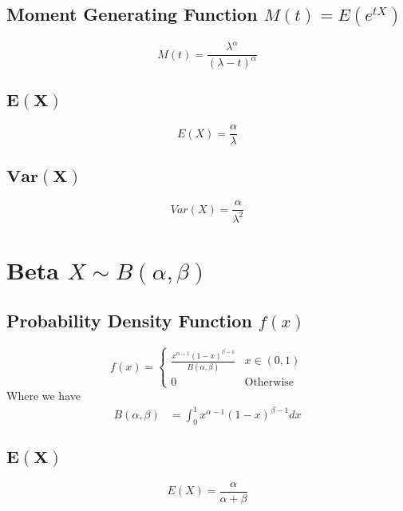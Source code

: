 \documentclass[12pt]{article}
\begin{document}
\subsection{Moment Generating Function $M(t)=E(e^{tX})$}

\begin{equation*}
    M(t)=\frac{\lambda^{\alpha}}{(\lambda -t)^{\alpha}}
\end{equation*}

\subsection{$\bm{E(X)}$}

\begin{equation*}
  E(X) = \frac{\alpha}{\lambda}
\end{equation*}

\subsection{$\bm{Var(X)}$}

\begin{equation*}
  Var(X)= \frac{\alpha}{\lambda^{2}}
\end{equation*}
\newpage
\section{Beta $X \sim B(\alpha,\beta)$}
\subsection{Probability Density Function $f(x)$}

\begin{equation*}
  f(x) =
  \begin{cases}
     \frac{x^{\alpha -1} (1-x)^{\beta -1}}{B(\alpha,\beta)} & x \in (0,1) \\
     0 & \text{Otherwise}
  \end{cases}
\end{equation*}
Where we have
\begin{align*}
  B(\alpha,\beta) &= \int_{0}^{1}x^{\alpha -1}(1-x)^{\beta -1} dx
\end{align*}

\subsection{$\bm{E(X)}$}

\begin{equation*}
  E(X) = \frac{\alpha}{\alpha + \beta}
\end{equation*}
\end{document}
